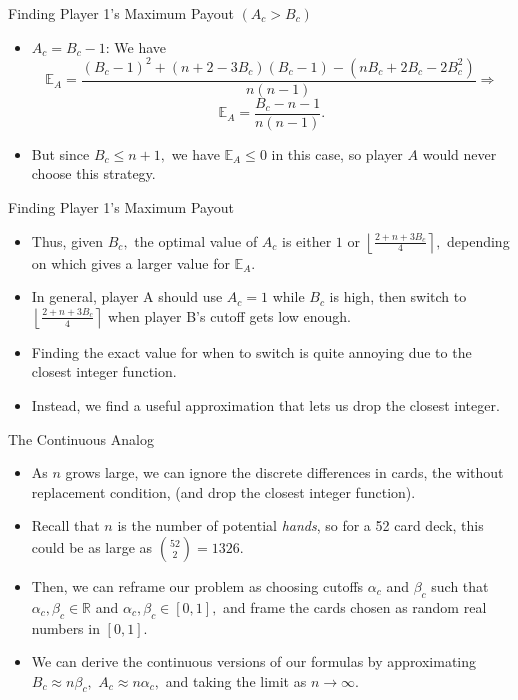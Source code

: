 \documentclass[aspectratio=169]{beamer}
\begin{document}
\begin{frame}{Finding Player 1's Maximum Payout $(A_c > B_c)$}
\begin{itemize}
      \item $A_c=B_c-1$: We have $$\mathbb{E}_A =\frac{(B_c-1)^2+(n+2-3B_c)(B_c-1)-(nB_c+2B_c-2B_c^2)}{n(n-1)} \Longrightarrow$$ \pause
       $$ \mathbb{E}_A=\frac{B_c-n-1}{n(n-1)}.$$ \pause
      \item But since $B_c \leq n+1,$ we have $ \mathbb{E}_A\leq0$ in this case, so player $A$ would never choose this strategy. 
\end{itemize}
\end{frame}
\begin{frame}{Finding Player 1's Maximum Payout}
\begin{itemize}
    \item Thus, given $B_c,$ the optimal value of $A_c$ is either $1$ or $\left \lfloor \frac{2+n+3B_c}{4} \right \rceil,$ depending on which gives a larger value for $\mathbb{E}_A.$ \pause
    \item In general, player A should use $A_c = 1$ while $B_c$ is high, then switch to $\left \lfloor \frac{2+n+3B_c}{4} \right \rceil$ when player B's cutoff gets low enough. \pause
    \item Finding the exact value for when to switch is quite annoying due to the closest integer function. \pause
    \item Instead, we find a useful approximation that lets us drop the closest integer.
    \end{itemize}
\end{frame}
\begin{frame}{The Continuous Analog}
\begin{itemize}
    \item As $n$ grows large, we can ignore the discrete differences in cards, the without replacement condition, (and drop the closest integer function). \pause
    \item Recall that $n$ is the number of potential \textit{hands}, so for a 52 card deck, this could be as large as ${52 \choose 2} = 1326.$ \pause
    \item Then, we can reframe our problem as choosing cutoffs $\alpha_c$ and $\beta_c$ such that $\alpha_c,\beta_c \in \mathbb{R}$ and $\alpha_c,\beta_c  \in [0,1],$ and frame the cards chosen as random real numbers in $[0,1].$ \pause
    \item We can derive the continuous versions of our formulas by approximating $B_c \approx n\beta_c,$ $A_c \approx n\alpha_c,$ and taking the limit as $n \to \infty.$ 
\end{itemize}
\end{frame}
\end{document}
